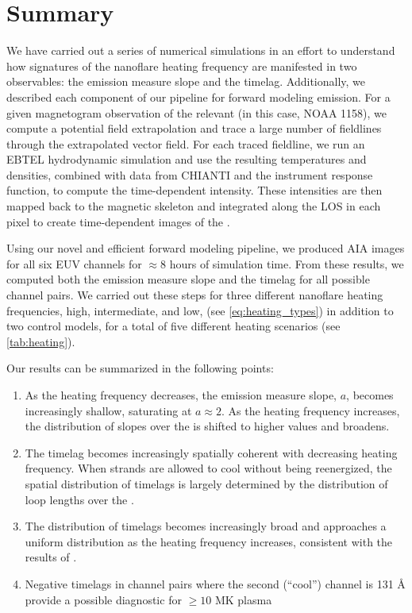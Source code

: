 
\section{Summary}\label{conclusions}

We have carried out a series of numerical simulations in an effort to understand how signatures of the nanoflare heating frequency are manifested in two observables: the emission measure slope and the timelag. Additionally, we described each component of our pipeline for forward modeling \AR{} emission. For a given magnetogram observation of the relevant \AR{} (in this case, NOAA 1158), we compute a potential field extrapolation and trace a large number of fieldlines through the extrapolated vector field. For each traced fieldline, we run an EBTEL hydrodynamic simulation and use the resulting temperatures and densities, combined with data from CHIANTI and the instrument response function, to compute the time-dependent intensity. These intensities are then mapped back to the magnetic skeleton and integrated along the LOS in each pixel to create time-dependent images of the \AR{}.

Using our novel and efficient forward modeling pipeline, we produced AIA images for all six EUV channels for $\approx8$ hours of simulation time. From these results, we computed both the emission measure slope and the timelag for all possible channel pairs. We carried out these steps for three different nanoflare heating frequencies, high, intermediate, and low, (see \autoref{eq:heating_types}) in addition to two control models, for a total of five different heating scenarios (see \autoref{tab:heating}).

Our results can be summarized in the following points:
\begin{enumerate}
    \item As the heating frequency decreases, the emission measure slope, $a$, becomes increasingly shallow, saturating at $a\approx2$. As the heating frequency increases, the distribution of slopes over the \AR{} is shifted to higher values and broadens.
    \item The timelag becomes increasingly spatially coherent with decreasing heating frequency. When strands are allowed to cool without being reenergized, the spatial distribution of timelags is largely determined by the distribution of loop lengths over the \AR{}.
    \item The distribution of timelags becomes increasingly broad and approaches a uniform distribution as the heating frequency increases, consistent with the results of \citet{viall_signatures_2016}.
    \item Negative timelags in channel pairs where the second (``cool'') channel is 131 \AA{} provide a possible diagnostic for $\ge10$ MK plasma
\end{enumerate}

